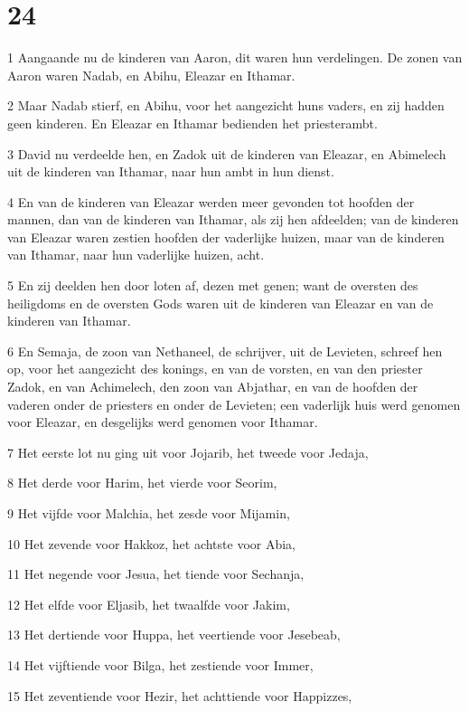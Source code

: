 \chapter{24}

\par 1 Aangaande nu de kinderen van Aaron, dit waren hun verdelingen. De zonen van Aaron waren Nadab, en Abihu, Eleazar en Ithamar.
\par 2 Maar Nadab stierf, en Abihu, voor het aangezicht huns vaders, en zij hadden geen kinderen. En Eleazar en Ithamar bedienden het priesterambt.
\par 3 David nu verdeelde hen, en Zadok uit de kinderen van Eleazar, en Abimelech uit de kinderen van Ithamar, naar hun ambt in hun dienst.
\par 4 En van de kinderen van Eleazar werden meer gevonden tot hoofden der mannen, dan van de kinderen van Ithamar, als zij hen afdeelden; van de kinderen van Eleazar waren zestien hoofden der vaderlijke huizen, maar van de kinderen van Ithamar, naar hun vaderlijke huizen, acht.
\par 5 En zij deelden hen door loten af, dezen met genen; want de oversten des heiligdoms en de oversten Gods waren uit de kinderen van Eleazar en van de kinderen van Ithamar.
\par 6 En Semaja, de zoon van Nethaneel, de schrijver, uit de Levieten, schreef hen op, voor het aangezicht des konings, en van de vorsten, en van den priester Zadok, en van Achimelech, den zoon van Abjathar, en van de hoofden der vaderen onder de priesters en onder de Levieten; een vaderlijk huis werd genomen voor Eleazar, en desgelijks werd genomen voor Ithamar.
\par 7 Het eerste lot nu ging uit voor Jojarib, het tweede voor Jedaja,
\par 8 Het derde voor Harim, het vierde voor Seorim,
\par 9 Het vijfde voor Malchia, het zesde voor Mijamin,
\par 10 Het zevende voor Hakkoz, het achtste voor Abia,
\par 11 Het negende voor Jesua, het tiende voor Sechanja,
\par 12 Het elfde voor Eljasib, het twaalfde voor Jakim,
\par 13 Het dertiende voor Huppa, het veertiende voor Jesebeab,
\par 14 Het vijftiende voor Bilga, het zestiende voor Immer,
\par 15 Het zeventiende voor Hezir, het achttiende voor Happizzes,
